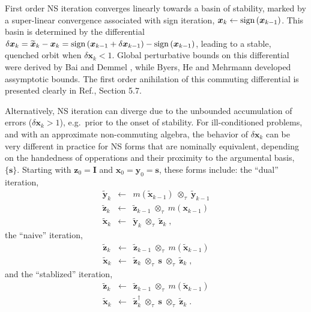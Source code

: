 \documentclass[letterpaper,twocolumn,amsmath,amsfont,amssymb,english,aps,jcp,preprintnumbers,groupaddress,nofootinbib,tightenlines]{revtex4}
\newcommand{\mat}[1]{\boldsymbol{#1}}
\newcommand{\mmat}[1]{\widetilde{\boldsymbol{#1}}}
\newcommand{\ot}{ {\scriptstyle \otimes}_{ \tau } }
\begin{document}
First order NS iteration converges linearly towards a basin of stability, marked by a super-linear convergence 
associated with sign iteration,  $\mat{x}_k \leftarrow {\rm sign} \left( \mat{x}_{k-1} \right)$. 
This basin is determined by the differential 
$\delta \mat{x}_k = \widetilde{\mat{x}}_k -\mat{x}_k = {\rm sign} \left(\mat{x}_{k-1}+\delta \mat{x}_{k-1} \right)
-{\rm sign} \left(\mat{x}_{k-1} \right)$,  leading to a stable, quenched orbit when $\delta \mat{x}_k < 1 $.  
Global perturbative bounds on this differential were derived by Bai and Demmel \cite{Bai98usingthe}, while
Byers, He and Mehrmann \cite{} developed assymptotic bounds.  The first order anihilation of 
this commuting differential is presented clearly in Ref.\cite{Higham08}, Section 5.7.

Alternatively, NS iteration can diverge due to the unbounded accumulation of errors ($\delta \mat{x}_k > 1 $), e.g.~prior
to the onset of stability.  For ill-conditioned problems, and with an approximate non-commuting algebra, the 
behavior of $\delta \mat{x}_k $ can be very different in practice for NS forms that are nominally equivalent,
depending on the handedness of opperations and their proximity to the argumental basis, $\{ \mat{s} \}$.  
Starting with $\mat{z}_0=\mat{I}$ and $\mat{x}_0=\mat{y}_0=\mat{s}$, these forms include: the ``dual'' iteration,
\begin{eqnarray}
\mmat{y}_{k}  &\leftarrow& m \left( \mmat{x}_{k-1} \right) \; \ot \;  \mmat{y}_{k-1}  \\
\mmat{z}_{k}  &\leftarrow& \mmat{z}_{k-1}  \; \ot \;  m \left( \mat{x}_{k-1} \right) \\
\mmat{x}_{k} &\leftarrow& \mmat{y}_{k} \; \ot \; \mmat{z}_{k} \; ,
\end{eqnarray}
the ``naive'' iteration,
\begin{eqnarray}
\mmat{z}_{k}  &\leftarrow& \mmat{z}_{k-1} \; \ot \; m \left( \mmat{x}_{k-1} \right) \\
\mmat{x}_{k} &\leftarrow& \mmat{z}_{k} \; \ot \; \mat{s} \; \ot \; \mmat{z}_{k} \; ,
\end{eqnarray}
and the ``stablized'' iteration,
\begin{eqnarray}
\mmat{z}_{k}  &\leftarrow& \mmat{z}_{k-1}  \; \ot \; m \left( \mmat{x}_{k-1} \right) \\
\mmat{x}_{k} &\leftarrow& \mmat{z}^\dagger_{k} \; \ot \; \mat{s} \; \ot \; \mmat{z}_{k} \; .
\end{eqnarray}
\end{document}
